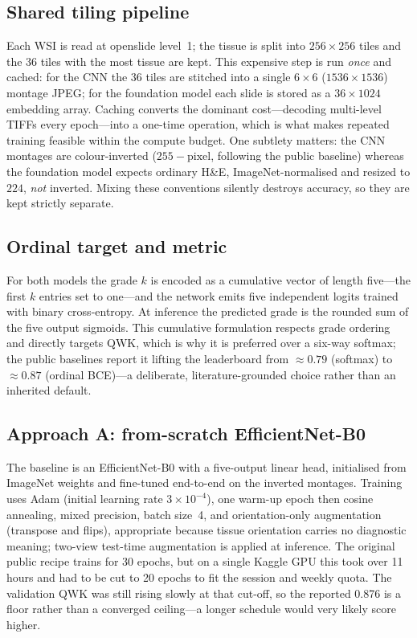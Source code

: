 \documentclass[conference]{IEEEtran}
\begin{document}
\subsection{Shared tiling pipeline}
Each WSI is read at openslide level~1; the tissue is split into $256\times256$
tiles and the 36 tiles with the most tissue are kept. This expensive step is run
\emph{once} and cached: for the CNN the 36 tiles are stitched into a single
$6\times6$ ($1536\times1536$) montage JPEG; for the foundation model each slide is
stored as a $36\times1024$ embedding array. Caching converts the dominant
cost---decoding multi-level TIFFs every epoch---into a one-time operation, which is
what makes repeated training feasible within the compute budget. One subtlety
matters: the CNN montages are colour-inverted ($255-\text{pixel}$, following the
public baseline) whereas the foundation model expects ordinary H\&E,
ImageNet-normalised and resized to $224$, \emph{not} inverted. Mixing these
conventions silently destroys accuracy, so they are kept strictly separate.

\subsection{Ordinal target and metric}
For both models the grade $k$ is encoded as a cumulative vector of length
five---the first $k$ entries set to one---and the network emits five independent
logits trained with binary cross-entropy. At inference the predicted grade is the
rounded sum of the five output sigmoids. This cumulative formulation respects grade
ordering and directly targets QWK, which is why it is preferred over a six-way
softmax; the public baselines report it lifting the leaderboard from $\approx0.79$
(softmax) to $\approx0.87$ (ordinal BCE)---a deliberate, literature-grounded choice
rather than an inherited default.

\subsection{Approach A: from-scratch EfficientNet-B0}
The baseline is an EfficientNet-B0 \cite{tan} with a five-output linear head,
initialised from ImageNet weights and fine-tuned end-to-end on the inverted
montages. Training uses Adam (initial learning rate $3\times10^{-4}$), one warm-up
epoch then cosine annealing, mixed precision, batch size~4, and orientation-only
augmentation (transpose and flips), appropriate because tissue orientation carries
no diagnostic meaning; two-view test-time augmentation is applied at inference. The
original public recipe trains for 30 epochs, but on a single Kaggle GPU this took
over 11 hours and had to be cut to 20 epochs to fit the session and weekly quota.
The validation QWK was still rising slowly at that cut-off, so the reported 0.876
is a floor rather than a converged ceiling---a longer schedule would very likely
score higher.
\end{document}
